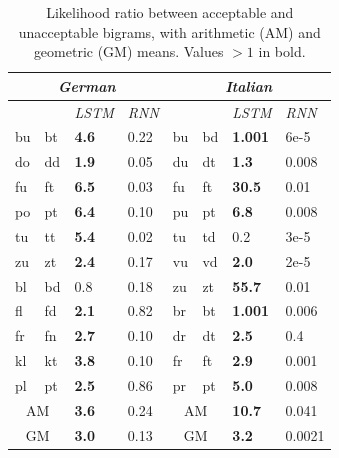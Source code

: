 \begin{table}[t]
  \begin{center}
	  \begin{tabular}{p{0.2cm}p{0.2cm}|p{0.6cm}p{0.6cm}||p{0.2cm}p{0.2cm}|p{0.99cm}p{0.8cm}}
	    \multicolumn{4}{c||}{\emph{German}}   &       \multicolumn{4}{c}{\emph{Italian}}\\      \hline
	    \multicolumn{2}{c}{\emph{}}&\emph{LSTM}&\emph{RNN} & \multicolumn{2}{c}{\emph{}}&  \emph{LSTM}&\emph{RNN}\\      \hline
                     bu &  bt &  \textbf{ 4.6} &  0.22             &  bu & bd & \textbf{ 1.001} & 6e-5 \\            
                     do &  dd &  \textbf{ 1.9} &  0.05             &  du & dt & \textbf{ 1.3} & 0.008 \\             
                     fu &  ft &  \textbf{ 6.5} &  0.03             &  fu & ft & \textbf{ 30.5} & 0.01 \\             
                     po &  pt &  \textbf{ 6.4} &  0.10             &  pu & pt & \textbf{ 6.8} & 0.008 \\             
                     tu &  tt &  \textbf{ 5.4} &  0.02             &  tu & td &  0.2 & 3e-5 \\                       
		     zu &  zt &  \textbf{ 2.4} &  0.17             &  vu & vd & \textbf{ 2.0} & 2e-5 \\              \cline{1-4}
                     bl &  bd &   0.8          & 0.18              &  zu & zt & \textbf{ 55.7} & 0.01 \\              \cline{5-8} 
                     fl &  fd &  \textbf{ 2.1} & 0.82              &  br & bt & \textbf{ 1.001}  &  0.006           \\ 
                     fr &  fn &  \textbf{ 2.7} & 0.10              &  dr & dt & \textbf{ 2.5} & 0.4 \\               
                     kl &  kt &  \textbf{ 3.8} & 0.10              &  fr & ft & \textbf{ 2.9} & 0.001 \\             
                     pl &  pt &  \textbf{ 2.5} & 0.86              &  pr & pt & \textbf{ 5.0} & 0.008 \\              \hline
	    \multicolumn{2}{c|}{AM}      & \textbf{3.6} & 0.24     & 	    \multicolumn{2}{c|}{AM}   & \textbf{10.7}  & 0.041          \\
	    \multicolumn{2}{c|}{GM} & \textbf{3.0} & 0.13          & 	    \multicolumn{2}{c|}{GM}   & \textbf{3.2} & 0.0021           \\
      \hline
    \end{tabular}
  \end{center}
	\caption{\label{tab:phonotactics-results} Likelihood ratio between acceptable and unacceptable bigrams, with arithmetic (AM) and geometric (GM) means. Values $>1$ in bold.}
\end{table}

